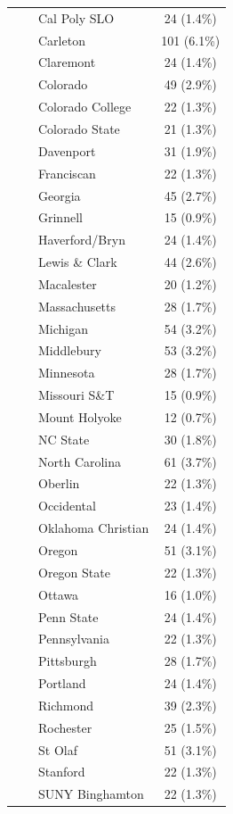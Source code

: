 \documentclass[
  letterpaper,
  DIV=11,
  numbers=noendperiod]{scrartcl}
\begin{document}
\begin{table}
\begin{tabular*}{\linewidth}{@{\extracolsep{\fill}}lc}
    Cal Poly SLO & 24 (1.4\%) \\ 
    Carleton & 101 (6.1\%) \\ 
    Claremont & 24 (1.4\%) \\ 
    Colorado & 49 (2.9\%) \\ 
    Colorado College & 22 (1.3\%) \\ 
    Colorado State & 21 (1.3\%) \\ 
    Davenport & 31 (1.9\%) \\ 
    Franciscan & 22 (1.3\%) \\ 
    Georgia & 45 (2.7\%) \\ 
    Grinnell & 15 (0.9\%) \\ 
    Haverford/Bryn & 24 (1.4\%) \\ 
    Lewis \& Clark & 44 (2.6\%) \\ 
    Macalester & 20 (1.2\%) \\ 
    Massachusetts & 28 (1.7\%) \\ 
    Michigan & 54 (3.2\%) \\ 
    Middlebury & 53 (3.2\%) \\ 
    Minnesota & 28 (1.7\%) \\ 
    Missouri S\&T & 15 (0.9\%) \\ 
    Mount Holyoke & 12 (0.7\%) \\ 
    NC State & 30 (1.8\%) \\ 
    North Carolina & 61 (3.7\%) \\ 
    Oberlin & 22 (1.3\%) \\ 
    Occidental & 23 (1.4\%) \\ 
    Oklahoma Christian & 24 (1.4\%) \\ 
    Oregon & 51 (3.1\%) \\ 
    Oregon State & 22 (1.3\%) \\ 
    Ottawa & 16 (1.0\%) \\ 
    Penn State & 24 (1.4\%) \\ 
    Pennsylvania & 22 (1.3\%) \\ 
    Pittsburgh & 28 (1.7\%) \\ 
    Portland & 24 (1.4\%) \\ 
    Richmond & 39 (2.3\%) \\ 
    Rochester & 25 (1.5\%) \\ 
    St Olaf & 51 (3.1\%) \\ 
    Stanford & 22 (1.3\%) \\ 
    SUNY Binghamton & 22 (1.3\%) \\ 

\end{tabular*}
\end{table}
\end{document}
